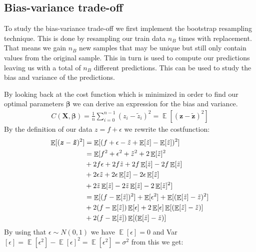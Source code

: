 \documentclass[12pt]{article}
\DeclareMathOperator*{\E}{\mathbb{E}}
\begin{document}
\subsection{Bias-variance trade-off}
To study the bias-variance trade-off we first implement the bootstrap resampling technique. This is done by resampling our train data $n_B$ times with replacement. That means we gain $n_B$ new samples that may be unique but still only contain values from the original sample. This in turn is used to compute our predictions leaving us with a total of $n_B$ different predictions. This can be used to study the bias and variance of the predictions.

By looking back at the cost function which is minimized in order to find our optimal parameters $\boldsymbol{\beta}$ we can derive an expression for the bias and variance.
\begin{align*}
  C(\boldsymbol{X}, \boldsymbol{\beta}) = \frac{1 }{n }\sum_ {i=0}^{n-1}(z_i - \tilde{z}_i)^2 = \E[(\boldsymbol{z}- \boldsymbol{\tilde{z}})^2]
\end{align*}
By the definition of our data $z = f +\epsilon$ we rewrite the costfunction:
\begin{align*}
  \E[(\boldsymbol{z}- \boldsymbol{\tilde{z}})^2] &= \E[(f + \epsilon - \tilde{z} + \E[\tilde{z}]- \E[\tilde{z}])^2] \\                                             &= \E[f^2 + \epsilon^2 + \tilde{z}^2 + 2\E[\tilde{z}]^2 \\
                                                 &+ 2f\epsilon + 2f\tilde{z} + 2f\E[\tilde{z}] - 2f\E[\tilde{z}]\\
                                                 &+ 2\epsilon\tilde{z} + 2\epsilon \E[\tilde{z}] - 2\epsilon \E[\tilde{z}]\\
                                                 &+ 2\tilde{z}\E[\tilde{z}] - 2\tilde{z}\E[\tilde{z}] -2\E[\tilde{z}]^2]\\
                                                 &= \E[(f-\E[\Tilde{z}])^2] + \E[\epsilon^2] + \E[( \E[\Tilde{z}] - \Tilde{z} )^2] \\
                                                 &+ 2(f-\E[\tilde{z}])\E[\epsilon]+2\E[\epsilon]\E[(\E[\tilde{z}]-\tilde{z} )] \\
                                                &+ 2(f-\E[\tilde{z}])\E[( \E[\tilde{z}] - \tilde{z} )]
\end{align*}
By using that $\epsilon \sim N(0,1)$ we have $\E[\epsilon] = 0$ and Var$[\epsilon] = \E[\epsilon^2]- \E[\epsilon]^2 = \E[\epsilon^2]=\sigma^2$ from this we get:
\end{document}
